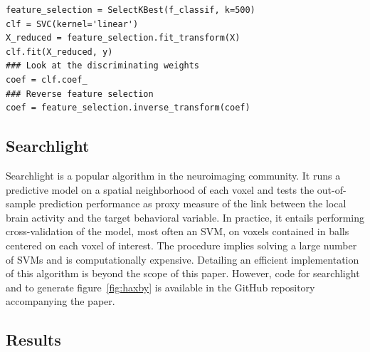 \documentclass{frontiersSCNS} %
\begin{document}
\begin{lstlisting}
feature_selection = SelectKBest(f_classif, k=500)
clf = SVC(kernel='linear')
X_reduced = feature_selection.fit_transform(X)
clf.fit(X_reduced, y)
### Look at the discriminating weights
coef = clf.coef_
### Reverse feature selection
coef = feature_selection.inverse_transform(coef)
\end{lstlisting}

\subsection{Searchlight}
\label{searchlight}

Searchlight \citep{kriegeskorte2006} is a popular algorithm in the
neuroimaging community. It runs a predictive model on a spatial
neighborhood of each voxel and tests the out-of-sample prediction
performance as proxy measure of the link between the local brain activity
and the target behavioral variable. In practice, it entails performing
cross-validation of the model, most often an SVM, on voxels contained in
balls centered on each voxel of interest. The procedure implies 
solving a large number of SVMs and is computationally expensive.
Detailing an efficient implementation of this algorithm is beyond the
scope of this paper. However, code for searchlight and to generate
figure~\ref{fig:haxby}
is available in the GitHub repository accompanying the paper.

\subsection{Results}
\end{document}
